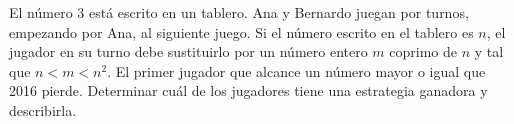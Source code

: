El número $3$ está escrito en un tablero. Ana y Bernardo juegan por turnos, empezando por Ana, al siguiente juego. Si el número escrito en el tablero es $n$, el jugador en su turno debe sustituirlo por un número entero $m$ coprimo de $n$ y tal que $n<m<n^2$. El primer jugador que alcance un número mayor o igual que 2016 pierde. Determinar cuál de los jugadores tiene una estrategia ganadora y describirla.
